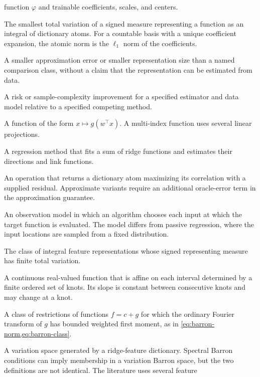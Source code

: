 \documentclass[11pt,twoside]{article}
\theoremstyle{definition}
\theoremstyle{remark}
\begin{document}
\begin{description}[style=unboxed,leftmargin=1.5em,labelindent=0pt]
function $\varphi$ and trainable coefficients, scales, and centers.
\item[Atomic norm]
The smallest total variation of a signed measure representing a function as
an integral of dictionary atoms. For a countable basis with a unique
coefficient expansion, the atomic norm is the $\ell_1$ norm of the
coefficients.
\item[Representation advantage]
A smaller approximation error or smaller representation size than a named
comparison class, without a claim that the representation can be estimated
from data.
\item[Learning advantage]
A risk or sample-complexity improvement for a specified estimator and data
model relative to a specified competing method.
\item[Ridge function]
A function of the form $x\mapsto g(w^\top x)$. A multi-index function uses
several linear projections.
\item[Projection pursuit]
A regression method that fits a sum of ridge functions and estimates their
directions and link functions.
\item[Atom-selection oracle]
An operation that returns a dictionary atom maximizing its correlation with
a supplied residual. Approximate variants require an additional oracle-error
term in the approximation guarantee.
\item[Active point-query model]
An observation model in which an algorithm chooses each input at which the
target function is evaluated. The model differs from passive regression,
where the input locations are sampled from a fixed distribution.
\item[Variation space]
The class of integral feature representations whose signed representing
measure has finite total variation.
\item[Linear spline]
A continuous real-valued function that is affine on each interval determined
by a finite ordered set of knots. Its slope is constant between consecutive
knots and may change at a knot.
\item[Spectral Barron class]
A class of restrictions of functions \(f=c+g\) for which the ordinary Fourier
transform of \(g\) has bounded weighted first moment, as in
\cref{eq:barron-norm,eq:barron-class}.
\item[Variation Barron space]
A variation space generated by a ridge-feature dictionary. Spectral Barron
conditions can imply membership in a variation Barron space, but the two
definitions are not identical. The literature uses several feature

\end{description}
\end{document}
